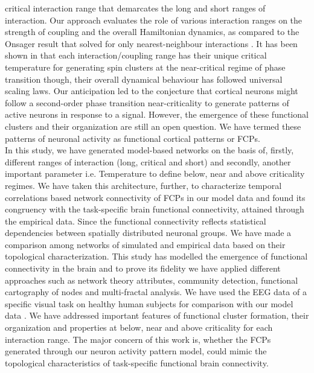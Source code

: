 \documentclass[preprintnumbers,amsmath,amssymb,onecolumn]{revtex4}
\begin{document}
critical interaction range that demarcates the long and short ranges of interaction. Our approach evaluates the role of various interaction ranges on the strength of coupling and the overall Hamiltonian dynamics, as compared to the Onsager result that solved for only nearest-neighbour interactions \citep{onsager1944}. It has been shown in \citep{Gundh2015} that each interaction/coupling range has their unique critical temperature for generating spin clusters at the near-critical regime of phase transition though, their overall dynamical behaviour has followed universal scaling laws. Our anticipation led to the conjecture that cortical neurons might follow a second-order phase transition near-criticality to generate patterns of active neurons in response to a signal. However, the emergence of these functional clusters and their organization are still an open question. We have termed these patterns of neuronal activity as functional cortical patterns or FCPs.\\

{\noindent} In this study, we have generated model-based networks on the basis of, firstly, different ranges of interaction (long, critical and short) and secondly, another important parameter i.e. Temperature to define below, near and above criticality regimes. We have taken this architecture, further, to characterize temporal correlations based network connectivity of FCPs in our model data and found its congruency with the task-specific brain functional connectivity, attained through the empirical data. Since the functional connectivity reflects statistical dependencies between spatially distributed neuronal groups. We have made a comparison among networks of simulated and empirical data based on their topological characterization. This study has modelled the emergence of functional connectivity in the brain and to prove its fidelity we have applied different approaches such as network theory attributes, community detection, functional cartography of nodes and multi-fractal analysis. We have used the EEG data of a specific visual task on healthy human subjects for comparison with our model data \citep{Begleiter1999}. We have addressed important features of functional cluster formation, their organization and properties at below, near and above criticality for each interaction range. The major concern of this work is, whether the FCPs generated through our neuron {activity} pattern model, could {mimic} the topological characteristics of task-specific functional brain connectivity.
\end{document}
